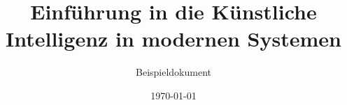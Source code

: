 \title{Einführung in die Künstliche Intelligenz in modernen Systemen}
\author{Beispieldokument}
\date{\today}
 
\maketitle

\tableofcontents
   
\newpage  